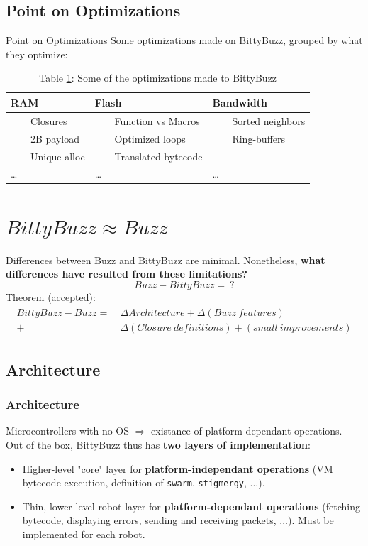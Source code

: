 \documentclass{beamer}
\newcommand{\tabitem}{~~\llap{\color{darkorange}\textbullet}~~}
\begin{document}
	\subsection{Point on Optimizations}
	\begin{frame}{Point on Optimizations}
		Some optimizations made on BittyBuzz, grouped by what they optimize:
		\begin{table}
			\begin{tabular}{l|l|l}
				RAM & Flash & Bandwidth\\
				\hline
				\tabitem Closures & \tabitem Function vs Macros & \tabitem Sorted neighbors\\
				\tabitem 2B payload & \tabitem Optimized loops & \tabitem Ring-buffers\\
				\tabitem Unique alloc & \tabitem Translated bytecode &\\
				\dots & \dots & \dots
			\end{tabular}
			\caption{
				\label{table:Optimizations}Table \ref{table:Optimizations}: Some of the optimizations made to BittyBuzz}
		\end{table}
	\end{frame}
	\section{$BittyBuzz \approx Buzz$}
	\begin{frame}
		Differences between Buzz and BittyBuzz are minimal. Nonetheless, \textbf{what differences have resulted from these limitations?}\\
		\[Buzz - BittyBuzz =~?\]
		Theorem (accepted):
		\begin{align}
		\begin{split}
		BittyBuzz - Buzz = ~&\Delta Architecture + \Delta (Buzz~features)\\
		+ &\Delta (Closure~definitions) + (small~improvements)
		\end{split}
		\end{align}
	\end{frame}
	\subsection{Architecture}
	\begin{frame}
		\frametitle{Architecture}
		Microcontrollers with no OS $\Rightarrow$ existance of platform-dependant operations.\\
		Out of the box, BittyBuzz thus has \textbf{two layers of implementation}:
		\begin{itemize}
			\item Higher-level "core" layer for \textbf{platform-independant operations} (VM bytecode execution, definition of \texttt{swarm}, \texttt{stigmergy}, ...).
			\item Thin, lower-level robot layer for \textbf{platform-dependant operations} (fetching bytecode, displaying errors, sending and receiving packets, ...). Must be implemented for each robot.
		\end{itemize}
	\end{frame}
\end{document}
